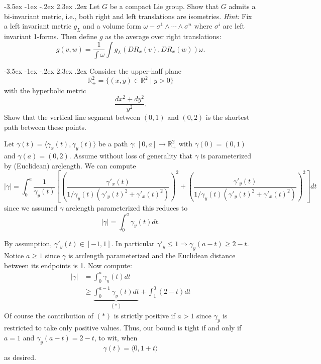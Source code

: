 \documentclass[10pt]{article}
\makeatletter
\renewcommand\section{\@startsection{section}{1}{\z@}%
                                  {-3.5ex \@plus -1ex \@minus -.2ex}%
                                  {2.3ex \@plus.2ex}%
                                  {\normalfont\large\bfseries}}
\newcommand{\R}{{\ensuremath{\mathbb{R}}} }
\newcommand{\hint}[1]{{\emph{Hint:} #1}} %
\makeatother
\begin{document}

\section{Let $G$ be a compact Lie group. Show that $G$ admits a bi-invariant metric, i.e., both right and left translations are isometries. \hint{Fix a left invariant metric $g_L$ and a volume form $\omega - \sigma^1 \wedge \cdots \wedge \sigma^n$ where $\sigma^i$ are left invariant 1-forms. Then define $g$ as the average over right translations: $$g(v,w) = \frac{1}{\int \omega} \int g_L (DR_x (v) , DR_x(w)) \omega.$$}}

\section{Consider the upper-half plane $$\R^2_+  = \{ (x,y) \in \R^2 \mid y > 0 \}$$ with the hyperbolic metric $$\frac{dx^2 + dy^2}{y^2}.$$ Show that  the vertical line segment between $(0,1)$ and $(0,2)$ is the shortest path between these points.}

Let $\gamma(t) = \langle \gamma_x(t), \gamma_y(t) \rangle$ be a path $\gamma:[0,a]\to \R_+^2$ with $\gamma(0) = (0,1)$ and $\gamma(a) = (0,2)$. Assume without loss of generality that $\gamma$ is parameterized by (Euclidean) arclength. We can compute
\[|\gamma| = \int_0^a  \frac{1}{\gamma_y(t)} \left[ \left( \frac{\gamma'_x(t)}{1/\gamma_y(t) \left(  \gamma'_y(t)^2 + \gamma'_x(t)^2 \right)} \right) ^2 +  \left( \frac{\gamma'_y(t)}{1/\gamma_y(t) \left(  \gamma'_y(t)^2 + \gamma'_x(t)^2 \right)} \right) ^2 \right] dt \]
since we assumed $\gamma$ arclength parameterized this reduces to
\[|\gamma| = \int_0^a \gamma_y(t) dt.\]

By assumption, $\gamma'_y(t) \in [-1,1]$. In particular $\gamma'_y \leq 1 \Rightarrow \gamma_y(a-t) \geq 2 -t$. Notice $a \geq 1$ since $\gamma$ is arclength parameterized and the Euclidean distance between its endpoints is 1. Now compute:
\begin{align*}|\gamma| &=  \int_0^a \gamma_y(t) dt \\ & \geq \underbrace{\int_0^{a-1}\gamma_y(t) dt}_{(*)} + \int_1^0(  2-t ) dt  \end{align*}
Of course the contribution of $(*)$ is strictly positive if $a >1$ since $\gamma_y$ is restricted to take only positive values. Thus, our bound is tight if and only if $a = 1$ and $\gamma_y(a-t) = 2- t$, to wit, when
\[\gamma(t) =  \langle 0, 1 +t \rangle\]
as desired.
\end{document}
